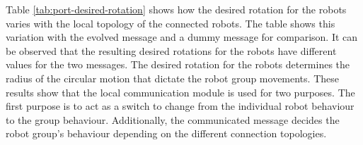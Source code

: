 Table \ref{tab:port-desired-rotation} shows how the desired rotation for the robots varies with the local topology of the connected robots.
The table shows this variation with the evolved message and a dummy message for comparison.
It can be observed that the resulting desired rotations for the robots have different values for the two messages.
The desired rotation for the robots determines the radius of the circular motion that dictate the robot group movements.
These results show that the local communication module is used for two purposes.
The first purpose is to act as a switch to change from the individual robot behaviour to the group behaviour.
Additionally, the communicated message decides the robot group's behaviour depending on the different connection topologies.





























